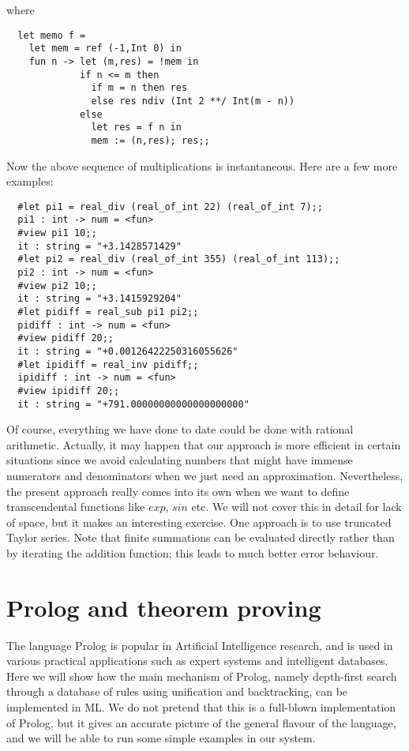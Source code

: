 \noindent where

\begin{boxed}\begin{verbatim}
  let memo f =
    let mem = ref (-1,Int 0) in
    fun n -> let (m,res) = !mem in
             if n <= m then
               if m = n then res
               else res ndiv (Int 2 **/ Int(m - n))
             else
               let res = f n in
               mem := (n,res); res;;
\end{verbatim}\end{boxed}

Now the above sequence of multiplications is instantaneous. Here are a few more
examples:

\begin{boxed}\begin{verbatim}
  #let pi1 = real_div (real_of_int 22) (real_of_int 7);;
  pi1 : int -> num = <fun>
  #view pi1 10;;
  it : string = "+3.1428571429"
  #let pi2 = real_div (real_of_int 355) (real_of_int 113);;
  pi2 : int -> num = <fun>
  #view pi2 10;;
  it : string = "+3.1415929204"
  #let pidiff = real_sub pi1 pi2;;
  pidiff : int -> num = <fun>
  #view pidiff 20;;
  it : string = "+0.00126422250316055626"
  #let ipidiff = real_inv pidiff;;
  ipidiff : int -> num = <fun>
  #view ipidiff 20;;
  it : string = "+791.00000000000000000000"
\end{verbatim}\end{boxed}

Of course, everything we have done to date could be done with rational
arithmetic. Actually, it may happen that our approach is more efficient in
certain situations since we avoid calculating numbers that might have immense
numerators and denominators when we just need an approximation. Nevertheless,
the present approach really comes into its own when we want to define
transcendental functions like $exp$, $sin$ etc. We will not cover this in
detail for lack of space, but it makes an interesting exercise. One approach is
to use truncated Taylor series. Note that finite summations can be evaluated
directly rather than by iterating the addition function; this leads to much
better error behaviour.

\section{Prolog and theorem proving}

The language Prolog is popular in Artificial Intelligence research, and is used
in various practical applications such as expert systems and intelligent
databases. Here we will show how the main mechanism of Prolog, namely
depth-first search through a database of rules using unification and
backtracking, can be implemented in ML. We do not pretend that this is a
full-blown implementation of Prolog, but it gives an accurate picture of the
general flavour of the language, and we will be able to run some simple
examples in our system.


